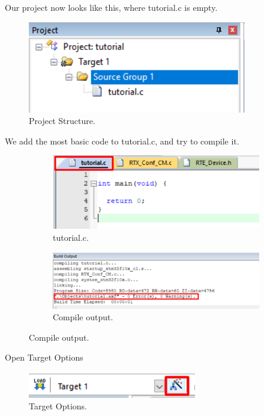 \documentclass{article}
\begin{document}
Our project now looks like this, where tutorial.c is empty.
\begin{figure}[H]
    \centering
    \includegraphics[width=0.5\linewidth]{pics/ProjectStructure1.png}
    \caption{Project Structure.}
    \label{fig:ProjectStructure1}
\end{figure}

We add the most basic code to tutorial.c, and try to compile it.
\begin{figure}[H]
    \centering
    \begin{subfigure}[b]{0.45\linewidth}
        \includegraphics[width=\linewidth]{pics/tutorial_c_basic.png}
        \caption{tutorial.c.}
    \end{subfigure}
    \begin{subfigure}[b]{0.45\linewidth}
        \includegraphics[width=\linewidth]{pics/BasicCompile.png}
        \caption{Compile output.}
    \end{subfigure}
    \label{fig:BasicCode}
\end{figure}

Open Target Options
\begin{figure}[H]
    \centering
    \includegraphics[width=0.5\linewidth]{pics/TargetOptions.png}
    \caption{Target Options.}
    \label{fig:ResetAndRun}
\end{figure}
\end{document}
